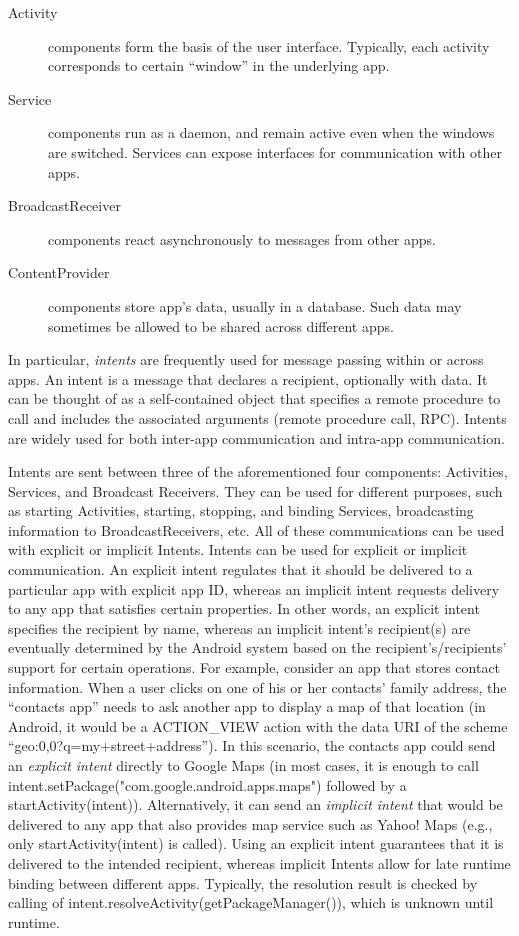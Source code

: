 \begin{description}
	\item[Activity] components form the basis of the user interface. Typically, each activity corresponds to certain ``window'' in the underlying app.
	\item[Service] components run as a daemon, and remain active even when the windows are switched. Services can expose interfaces for communication with other apps.
	\item[BroadcastReceiver] components react asynchronously to messages from other apps.
	\item[ContentProvider] components store app's data, usually in a database. Such data may sometimes be allowed to be shared across different apps.
\end{description}

In particular, \emph{intents} are frequently used for message passing within or across apps. An intent is a message that declares a recipient, optionally with data. It can be thought of as a self-contained object that specifies a remote procedure to call and includes the associated arguments (remote procedure call, RPC). Intents are widely used for both inter-app communication and intra-app communication.

Intents are sent between three of the aforementioned four components: Activities, Services, and Broadcast Receivers. They can be used for different purposes, such as starting Activities, starting, stopping, and binding Services, broadcasting information to BroadcastReceivers, etc. All of these communications can be used with explicit or implicit Intents.
Intents can be used for explicit or implicit communication. An explicit intent regulates that it should be delivered to a particular app with explicit app ID, whereas an implicit intent requests delivery to any app that satisfies certain properties. In other words, an explicit intent specifies the recipient by name, whereas an implicit intent's recipient(s) are eventually determined by the Android system based on the recipient's/recipients' support for certain operations. For example, consider an app that stores contact information. When a user clicks on one of his or her contacts' family address, the ``contacts app'' needs to ask another app to display a map of that location (in Android, it would be a \textsf{ACTION\_VIEW} action with the data URI of the scheme ``\textsf{geo:0,0?q=my+street+address}''). In this scenario, the contacts app could send an \emph{explicit intent} directly to Google Maps (in most cases, it is enough to call \textsf{intent.setPackage("com.google.android.apps.maps")} followed by a \textsf{startActivity(intent)}). Alternatively, it can send an \emph{implicit intent} that would be delivered to any app that also provides map service such as Yahoo! Maps (e.g., only \textsf{startActivity(intent)} is called). Using an explicit intent guarantees that it is delivered to the intended recipient, whereas implicit Intents allow for late runtime binding between different apps. {Typically, the resolution result is checked by calling of \textsf{intent.resolveActivity(getPackageManager())}, which is unknown until runtime.}
